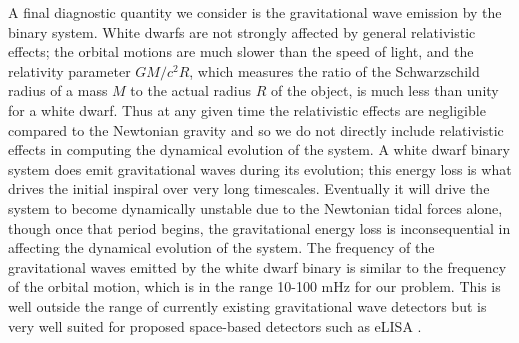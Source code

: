 \documentclass[iop,numberedappendix]{../emulateapj}
\begin{document}
A final diagnostic quantity we consider is the gravitational wave emission by the 
binary system. White dwarfs are not strongly affected by general relativistic effects;
the orbital motions are much slower than the speed of light, and the relativity parameter 
$GM / c^2 R$, which measures the ratio of the Schwarzschild radius of a mass $M$ to the actual 
radius $R$ of the object, is much less than unity for a white dwarf. Thus at any given time the 
relativistic effects are negligible compared to the Newtonian gravity and so we do not 
directly include relativistic effects in computing the dynamical evolution of the system.
A white dwarf binary system does emit gravitational waves during its evolution; this energy loss 
is what drives the initial inspiral over very long timescales. Eventually it will drive the system 
to become dynamically unstable due to the Newtonian tidal forces alone, though once that period begins, 
the gravitational energy loss is inconsequential in affecting the dynamical evolution of the system. 
The frequency of the gravitational waves emitted by the white dwarf binary 
is similar to the frequency of the orbital motion, which is in the range 
10-100 mHz for our problem. This is well outside the range of currently existing 
gravitational wave detectors but is very well suited for proposed space-based detectors such as eLISA \citep{eLISA}.
\end{document}
